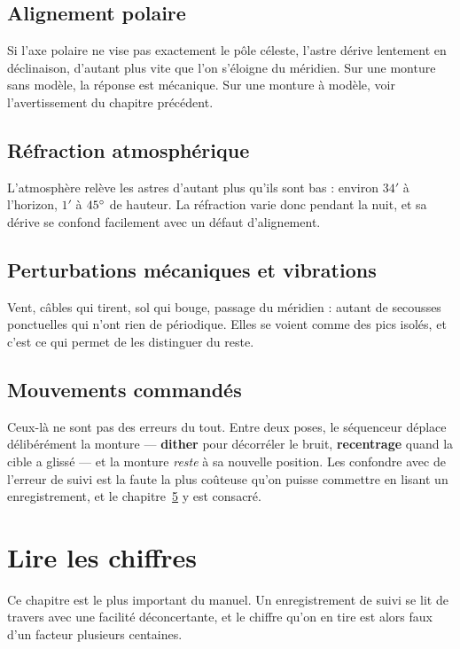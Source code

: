 \section{Alignement polaire}

Si l'axe polaire ne vise pas exactement le pôle céleste, l'astre dérive
lentement en déclinaison, d'autant plus vite que l'on s'éloigne du méridien.
Sur une monture sans modèle, la réponse est mécanique. Sur une monture à
modèle, voir l'avertissement du chapitre précédent.

\section{Réfraction atmosphérique}

L'atmosphère relève les astres d'autant plus qu'ils sont bas : environ
$34'$ à l'horizon, $1'$ à $45^\circ$ de hauteur. La réfraction varie donc pendant la
nuit, et sa dérive se confond facilement avec un défaut d'alignement.

\section{Perturbations mécaniques et vibrations}

Vent, câbles qui tirent, sol qui bouge, passage du méridien : autant de
secousses ponctuelles qui n'ont rien de périodique. Elles se voient comme des
pics isolés, et c'est ce qui permet de les distinguer du reste.

\section{Mouvements commandés}

Ceux-là ne sont pas des erreurs du tout. Entre deux poses, le séquenceur
déplace délibérément la monture --- \textbf{dither} pour décorréler le bruit,
\textbf{recentrage} quand la cible a glissé --- et la monture \emph{reste} à sa
nouvelle position. Les confondre avec de l'erreur de suivi est la faute la plus
coûteuse qu'on puisse commettre en lisant un enregistrement, et le
chapitre~\ref{ch:stats} y est consacré.

\chapter{Lire les chiffres}
\label{ch:stats}

\begin{warning}
Ce chapitre est le plus important du manuel. Un enregistrement de suivi se lit
de travers avec une facilité déconcertante, et le chiffre qu'on en tire est
alors faux d'un facteur plusieurs centaines.
\end{warning}

